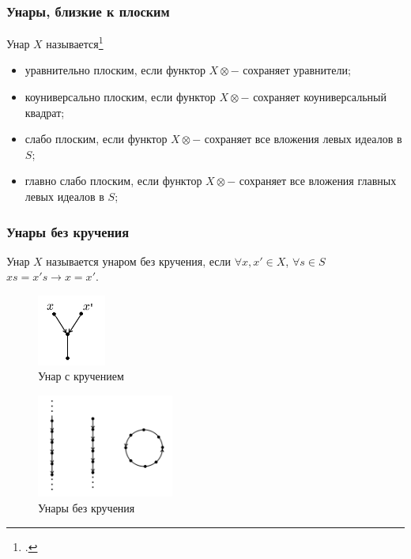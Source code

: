 \documentclass[11pt, notheorems]{beamer}
\begin{document}
\begin{frame}
	\frametitle{Унары, близкие к плоским}

	Унар $X$ называется\footcite[определения III.9.1 и III.8.1]{kilp}

	\begin{itemize}
		\item уравнительно плоским, если функтор $X \otimes - $ сохраняет уравнители; \pause
		\item коуниверсально плоским, если функтор $X \otimes - $ сохраняет коуниверсальный квадрат; \pause
		\item слабо плоским, если функтор $X \otimes - $ сохраняет все вложения левых идеалов в $S$; \pause
		\item главно слабо плоским, если функтор $X \otimes - $ сохраняет все вложения главных левых идеалов в $S$;

	\end{itemize}
\end{frame}

\begin{frame}
	\frametitle{Унары без кручения}

	Унар $X$ называется унаром без кручения, если $\forall x, x' \in X$, $\forall s \in S$ $xs = x's \rightarrow x = x'$.

	\pause

	\begin{figure}
		\center
		\includegraphics[width=0.2\textwidth]{torsion_free.png}
		\caption{Унар с кручением}
	\end{figure}

	\pause

	\begin{figure}
		\center
		\includegraphics[width=0.4\textwidth]{flat_unar_1.png}
		\caption{Унары без кручения}
	\end{figure}
\end{frame}
\end{document}

